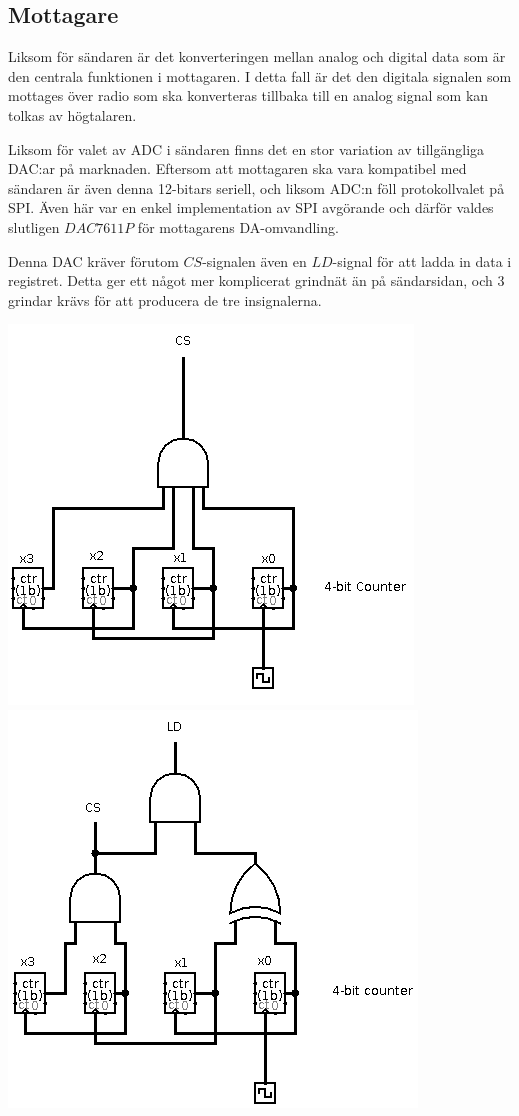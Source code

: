 \documentclass[a4paper,10pt]{article}
\begin{document}



\subsection{Mottagare}

Liksom för sändaren är det konverteringen mellan analog och digital data som
är den centrala funktionen i mottagaren. I detta fall är det den digitala 
signalen som mottages över radio som ska konverteras tillbaka till en analog
signal som kan tolkas av högtalaren.

Liksom för valet av ADC i sändaren finns det en stor variation av tillgängliga 
DAC:ar på marknaden. Eftersom att mottagaren ska vara kompatibel med sändaren
är även denna 12-bitars seriell, och liksom ADC:n föll protokollvalet på SPI. 
Även här var en enkel implementation av SPI avgörande och därför valdes 
slutligen $DAC7611P$ för mottagarens DA-omvandling. 

Denna DAC kräver förutom $CS$-signalen även en $LD$-signal för att ladda in data
i registret. Detta ger ett något mer komplicerat grindnät än på sändarsidan, och
3 grindar krävs för att producera de tre insignalerna.

\includegraphics{adccircuit.png}
\includegraphics{daccircuit.png}
\end{document}
